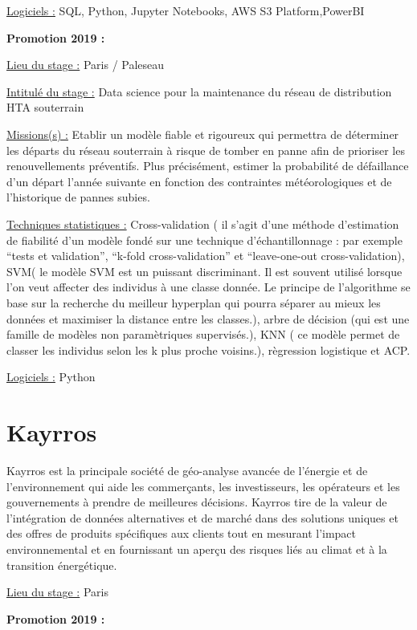 \documentclass[
  letterpaper,
  DIV=11,
  numbers=noendperiod]{scrreprt}
\begin{document}
\uline{Logiciels :} SQL, Python, Jupyter Notebooks, AWS S3
Platform,PowerBI

\textbf{Promotion 2019 :}

\uline{Lieu du stage :} Paris / Paleseau

\uline{Intitulé du stage :} Data science pour la maintenance du réseau
de distribution HTA souterrain

\uline{Missions(s) :} Etablir un modèle fiable et rigoureux qui
permettra de déterminer les départs du réseau souterrain à risque de
tomber en panne afin de prioriser les renouvellements préventifs. Plus
précisément, estimer la probabilité de défaillance d'un départ l'année
suivante en fonction des contraintes météorologiques et de l'historique
de pannes subies.

\uline{Techniques statistiques :} Cross-validation ( il s'agit d'une
méthode d'estimation de fiabilité d'un modèle fondé sur une technique
d'échantillonnage : par exemple ``tests et validation'', ``k-fold
cross-validation'' et ``leave-one-out cross-validation), SVM( le modèle
SVM est un puissant discriminant. Il est souvent utilisé lorsque l'on
veut affecter des individus à une classe donnée. Le principe de
l'algorithme se base sur la recherche du meilleur hyperplan qui pourra
séparer au mieux les données et maximiser la distance entre les
classes.), arbre de décision (qui est une famille de modèles non
paramètriques supervisés.), KNN ( ce modèle permet de classer les
individus selon les k plus proche voisins.), règression logistique et
ACP.

\uline{Logiciels :} Python

\hypertarget{kayrros}{%
\section{\texorpdfstring{\textbf{Kayrros}}{Kayrros}}\label{kayrros}}

Kayrros est la principale société de géo-analyse avancée de l'énergie et
de l'environnement qui aide les commerçants, les investisseurs, les
opérateurs et les gouvernements à prendre de meilleures décisions.
Kayrros tire de la valeur de l'intégration de données alternatives et de
marché dans des solutions uniques et des offres de produits spécifiques
aux clients tout en mesurant l'impact environnemental et en fournissant
un aperçu des risques liés au climat et à la transition énergétique.

\uline{Lieu du stage :} Paris

\textbf{Promotion 2019 :}
\end{document}
